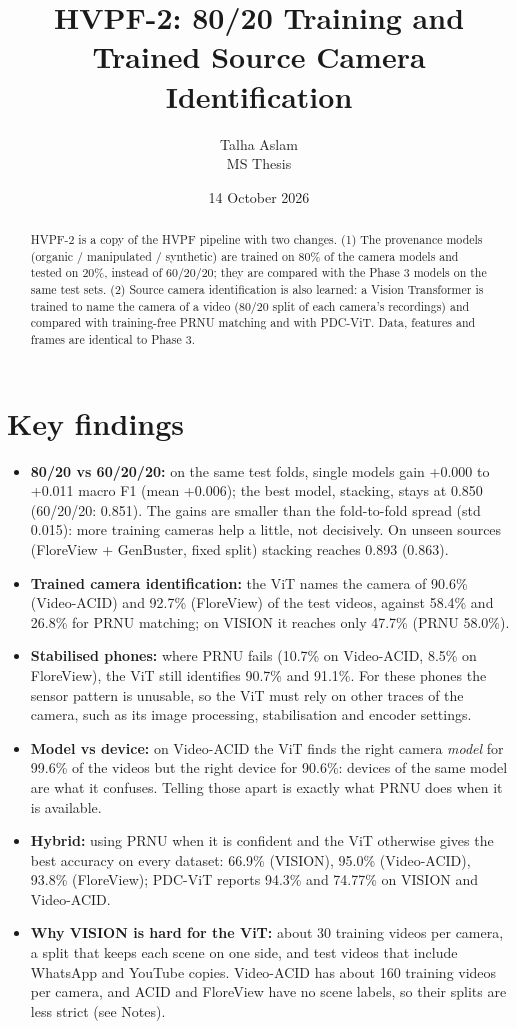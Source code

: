 \documentclass[11pt,a4paper]{article}
\title{\textbf{HVPF-2: 80/20 Training and Trained Source Camera Identification}}
\author{Talha Aslam\\ MS Thesis}
\date{14 October 2026}
\begin{document}
\maketitle
\begin{abstract}\noindent
HVPF-2 is a copy of the HVPF pipeline with two changes. (1) The provenance models (organic /
manipulated / synthetic) are trained on 80\% of the camera models and tested on 20\%, instead of
60/20/20; they are compared with the Phase 3 models on the same test sets. (2) Source camera
identification is also learned: a Vision Transformer is trained to name the camera of a video
(80/20 split of each camera's recordings) and compared with training-free PRNU matching and with
PDC-ViT. Data, features and frames are identical to Phase 3.
\end{abstract}
\section*{Key findings}\begin{itemize}
\item \textbf{80/20 vs 60/20/20:} on the same test folds, single models gain +0.000 to +0.011 macro F1 (mean +0.006); the best model, stacking, stays at 0.850 (60/20/20: 0.851). The gains are smaller than the fold-to-fold spread (std 0.015): more training cameras help a little, not decisively. On unseen sources (FloreView + GenBuster, fixed split) stacking reaches 0.893 (0.863).
\item \textbf{Trained camera identification:} the ViT names the camera of 90.6\% (Video-ACID) and 92.7\% (FloreView) of the test videos, against 58.4\% and 26.8\% for PRNU matching; on VISION it reaches only 47.7\% (PRNU 58.0\%).
\item \textbf{Stabilised phones:} where PRNU fails (10.7\% on Video-ACID, 8.5\% on FloreView), the ViT still identifies 90.7\% and 91.1\%. For these phones the sensor pattern is unusable, so the ViT must rely on other traces of the camera, such as its image processing, stabilisation and encoder settings.
\item \textbf{Model vs device:} on Video-ACID the ViT finds the right camera \emph{model} for 99.6\% of the videos but the right device for 90.6\%: devices of the same model are what it confuses. Telling those apart is exactly what PRNU does when it is available.
\item \textbf{Hybrid:} using PRNU when it is confident and the ViT otherwise gives the best accuracy on every dataset: 66.9\% (VISION), 95.0\% (Video-ACID), 93.8\% (FloreView); PDC-ViT reports 94.3\% and 74.77\% on VISION and Video-ACID.
\item \textbf{Why VISION is hard for the ViT:} about 30 training videos per camera, a split that keeps each scene on one side, and test videos that include WhatsApp and YouTube copies. Video-ACID has about 160 training videos per camera, and ACID and FloreView have no scene labels, so their splits are less strict (see Notes).
\end{itemize}
\end{document}
